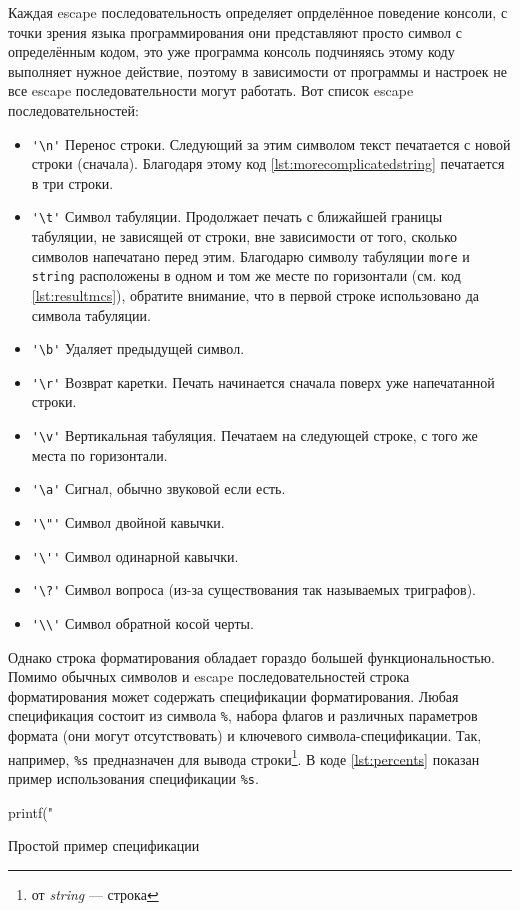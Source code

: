 \documentclass[12pt]{article}
\begin{document}
Каждая escape последовательность определяет опрделённое поведение консоли, с точки зрения языка программирования они представляют просто символ с определённым кодом, это уже программа консоль подчиняясь этому коду выполняет нужное действие, поэтому в зависимости от программы и настроек не все escape последовательности могут работать. Вот список escape последовательностей:
\begin{itemize}
 \item \verb|'\n'| Перенос строки. Следующий за этим символом текст печатается с новой строки (сначала). Благодаря этому код \ref{lst:morecomplicatedstring} печатается в три строки.
 \item \verb|'\t'| Символ табуляции. Продолжает печать с ближайшей границы табуляции, не зависящей от строки, вне зависимости от того, сколько символов напечатано перед этим. Благодарю символу табуляции \verb|more| и \verb|string| расположены в одном и том же месте по горизонтали (см. код \ref{lst:resultmcs}), обратите внимание, что в первой строке использовано да символа табуляции.
 \item \verb|'\b'| Удаляет предыдущей символ.
 \item \verb|'\r'| Возврат каретки. Печать начинается сначала поверх уже напечатанной строки.
 \item \verb|'\v'| Вертикальная табуляция. Печатаем на следующей строке, с того же места по горизонтали.
 \item \verb|'\a'| Сигнал, обычно звуковой если есть.
 \item \verb|'\"'| Символ двойной кавычки.
 \item \verb|'\''| Символ одинарной кавычки.
 \item \verb|'\?'| Символ вопроса (из-за существования так называемых триграфов).
 \item \verb|'\\'| Символ обратной косой черты.
\end{itemize}

Однако строка форматирования обладает гораздо большей функциональностью. Помимо обычных символов и escape последовательностей строка форматирования может содержать спецификации форматирования. Любая спецификация состоит из символа \verb|%|, набора флагов и различных параметров формата (они могут отсутствовать) и ключевого символа-спецификации. Так, например, \verb|%s| предназначен для вывода строки\footnote{от \textit{string} --- строка}. В коде \ref{lst:percents} показан пример использования спецификации \verb|%s|.
\begin{listing}[H]
\begin{center}
\begin{ccode}
printf("%
\end{ccode}
\end{center}
\caption{Простой пример спецификации}
\label{lst:percents}
\end{listing}
\end{document}

